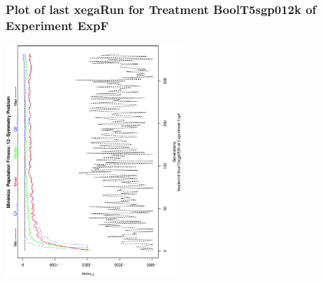  \begin{frame}
 \frametitle{ Plot of last xegaRun for Treatment BoolT5sgp012k of Experiment ExpF }
 \begin{center}
\includegraphics[width=0.5\textwidth, angle=-90]
{ExpFPlotPopStatsFigure010.eps}
 \end{center}
 \label{templateReport/ExpFPlotPopStatsFigure010.eps}  
 \end{frame}

